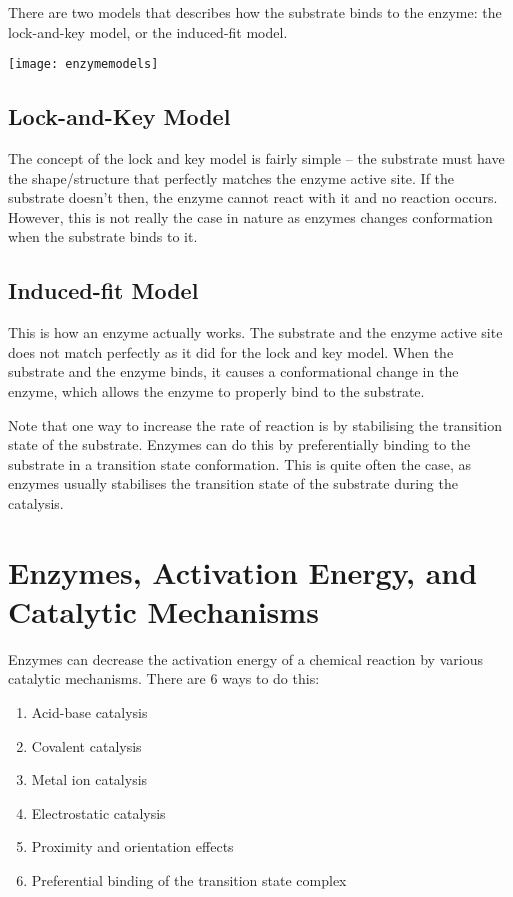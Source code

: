 \documentclass[a4paper, 12pt]{report}
\begin{document}
There are two models that describes how the substrate binds to the enzyme: the lock-and-key model, or the induced-fit model.

\begin{center}
\texttt{[image: enzymemodels]}
\end{center}

\subsection{Lock-and-Key Model}

The concept of the lock and key model is fairly simple -- the substrate must have the shape/structure that perfectly matches the enzyme active site.
If the substrate doesn't then, the enzyme cannot react with it and no reaction occurs.
However, this is not really the case in nature as enzymes changes conformation when the substrate binds to it.

\subsection{Induced-fit Model}

This is how an enzyme actually works.
The substrate and the enzyme active site does not match perfectly as it did for the lock and key model.
When the substrate and the enzyme binds, it causes a conformational change in the enzyme, which allows the enzyme to properly bind to the substrate.

Note that one way to increase the rate of reaction is by stabilising the transition state of the substrate.
Enzymes can do this by preferentially binding to the substrate in a transition state conformation.
This is quite often the case, as enzymes usually stabilises the transition state of the substrate during the catalysis.

\section{Enzymes, Activation Energy, and \\Catalytic Mechanisms}

Enzymes can decrease the activation energy of a chemical reaction by various catalytic mechanisms.
There are 6 ways to do this:

\begin{enumerate}
\item Acid-base catalysis
\item Covalent catalysis
\item Metal ion catalysis
\item Electrostatic catalysis
\item Proximity and orientation effects
\item Preferential binding of the transition state complex
\end{enumerate}
\end{document}
